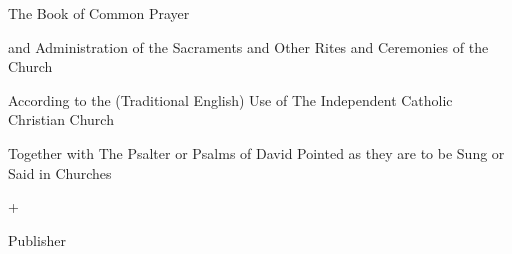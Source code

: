 The Book of Common Prayer

and Administration of the Sacraments 
and Other Rites and Ceremonies of the Church

{According to the (Traditional English) Use of}
The Independent Catholic Christian Church

Together with
The Psalter or Psalms of David
Pointed as they are to be Sung or Said in Churches

+

Publisher




